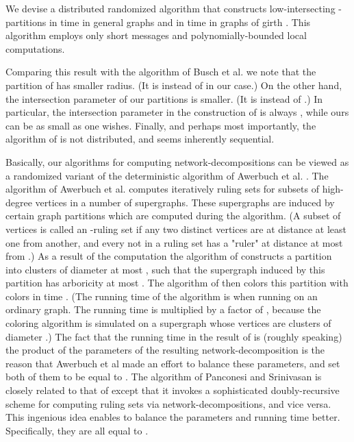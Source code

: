 \documentclass[11pt]{article}
\begin{document}
We devise a distributed randomized algorithm that constructs low-intersecting -partitions in time  in general graphs and in  time in graphs of girth  . This algorithm employs only short messages and polynomially-bounded local computations.

Comparing this result with the algorithm of Busch et al. \cite{BDRRS12} we note that the partition of \cite{BDRRS12} has smaller radius. (It is  instead of  in our case.) On the other hand, the intersection parameter  of our partitions is smaller. (It is  instead of .) In particular, the intersection parameter in the construction of \cite{BDRRS12} is always , while ours can be as small as one wishes. Finally, and perhaps most importantly, the algorithm of \cite{BDRRS12} is not distributed, and seems inherently sequential.

Basically, our algorithms for computing network-decompositions can be viewed as a randomized variant of the deterministic algorithm of Awerbuch et al. \cite{AGLP89}. The algorithm of Awerbuch et al. \cite{AGLP89} computes iteratively ruling sets for subsets of high-degree vertices in a number of supergraphs. These supergraphs are induced by certain graph partitions which are computed during the algorithm. (A subset  of vertices is called an -ruling set if any two distinct vertices  are at distance at least  one from another, and every  not in a ruling set has a "ruler"  at distance at most  from .)
As a result of the computation the algorithm of \cite{AGLP89} constructs a partition into clusters of diameter at most , such that the supergraph induced by this partition has arboricity at most . The algorithm of \cite{AGLP89} then colors this partition with  colors in time . (The running time of the algorithm is  when running on an ordinary graph. The running time is multiplied by a factor of , because the coloring algorithm is simulated on a supergraph whose vertices are clusters of diameter .) The fact that the running time in the result of \cite{AGLP89} is (roughly speaking) the product  of the parameters of the resulting network-decomposition is the reason that Awerbuch et al \cite{AGLP89} made an effort to balance these parameters, and set both of them to be equal to . The algorithm of Panconesi and Srinivasan \cite{PS95} is closely related to that of \cite{AGLP89} except that it invokes a sophisticated doubly-recursive scheme for computing ruling sets via network-decompositions, and vice versa.
 This ingenious idea enables \cite{PS95} to balance the parameters and running time better. Specifically, they are all equal to .
\end{document}
